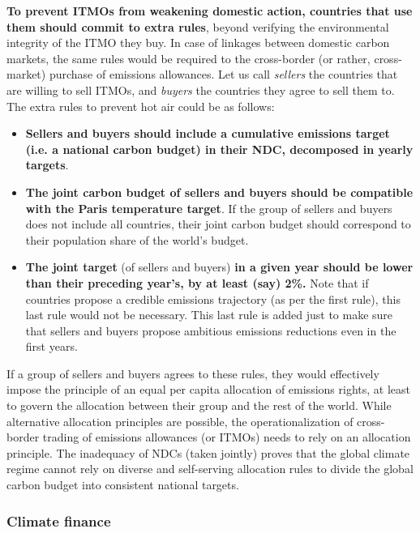 \documentclass[12pt,english]{article}
\begin{document}
\textbf{To prevent ITMOs from weakening domestic action, countries that use them should commit to extra rules}, beyond verifying the environmental integrity of the ITMO they buy. In case of linkages between domestic carbon markets, the same rules would be required to the cross-border (or rather, cross-market) purchase of emissions allowances. Let us call \textit{sellers} the countries that are willing to sell ITMOs, and \textit{buyers} the countries they agree to sell them to. The extra rules to prevent hot air could be as follows: 
\begin{itemize}
  \item \textbf{Sellers and buyers should include a cumulative emissions target (i.e. a national carbon budget) in their NDC, decomposed in yearly targets}.
  \item \textbf{The joint carbon budget of sellers and buyers should be compatible with the Paris temperature target}. If the group of sellers and buyers does not include all countries, their joint carbon budget should correspond to their population share of the world's budget.
  \item \textbf{The joint target} (of sellers and buyers) \textbf{in a given year should be lower than their preceding year's, %
  by at least (say) 2\%.} Note that if countries propose a credible emissions trajectory (as per the first rule), this last rule would not be necessary. This last rule is added just to make sure that sellers and buyers propose ambitious emissions reductions even in the first years. %
\end{itemize}

If a group of sellers and buyers agrees to these rules, they would effectively impose the principle of an equal per capita allocation of emissions rights, at least to govern the allocation between their group and the rest of the world. While alternative allocation principles are possible, the operationalization of cross-border trading of emissions allowances (or ITMOs) needs to rely on an allocation principle. The inadequacy of NDCs (taken jointly) proves that the global climate regime cannot rely on diverse and self-serving allocation rules to divide the global carbon budget into consistent national targets. 


\subsubsection{Climate finance\label{subsubsec:finance}}
\end{document}
